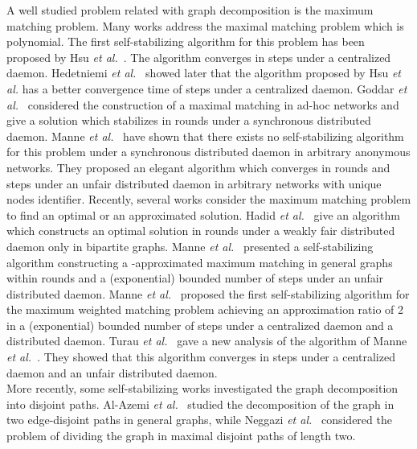 \documentclass[11pt,letterpaper,onecolumn]{article}
\begin{document}
A well studied problem related with graph decomposition is the maximum matching problem. Many works address the maximal matching problem which is polynomial. The first self-stabilizing algorithm for this problem has been proposed by Hsu \emph{et al.}~\cite{HsuH92}. The algorithm converges in  steps under a centralized daemon. Hedetniemi \emph{et al.}~\cite{HedetniemiJS01} showed later that the algorithm proposed by Hsu \emph{et al.} has a better convergence time of  steps under a centralized daemon. Goddar \emph{et al.}~\cite{GoddardHJS03} considered the construction of a maximal matching in ad-hoc networks and give a solution which stabilizes in  rounds under a synchronous distributed daemon. Manne \emph{et al.}~\cite{ManneMPT09} have shown that there exists no self-stabilizing algorithm for this problem under a synchronous distributed daemon in arbitrary anonymous networks. They proposed an elegant algorithm which converges in  rounds and  steps under an unfair distributed daemon in arbitrary networks with unique nodes identifier. Recently, several works consider the maximum matching problem to find an optimal or an approximated solution. Hadid \emph{et al.}~\cite{HadidK09} give an algorithm which constructs an optimal solution in  rounds under a weakly fair distributed daemon only in bipartite graphs. Manne \emph{et al.}~\cite{ManneMPT11} presented a self-stabilizing algorithm constructing a -approximated maximum matching in general graphs within  rounds and a (exponential) bounded number of steps under an unfair distributed daemon. Manne \emph{et al.}~\cite{ManneM07} proposed the first self-stabilizing algorithm for the maximum weighted matching problem achieving an approximation ratio of 2 in a (exponential) bounded number of steps under a centralized daemon and a distributed daemon. Turau \emph{et al.}~\cite{TurauH11a} gave a new analysis of the algorithm of Manne \emph{et al.}~\cite{ManneM07}. They showed that this algorithm converges in  steps under a centralized daemon and an unfair distributed daemon.\\
More recently, some self-stabilizing works investigated the graph decomposition into disjoint paths. Al-Azemi \emph{et al.}~\cite{Al-AzemiK11} studied the decomposition of the graph in two edge-disjoint paths in general graphs, while Neggazi \emph{et al.}~\cite{NeggaziHK12b} considered the problem of dividing the graph in maximal disjoint paths of length two.
\end{document}
